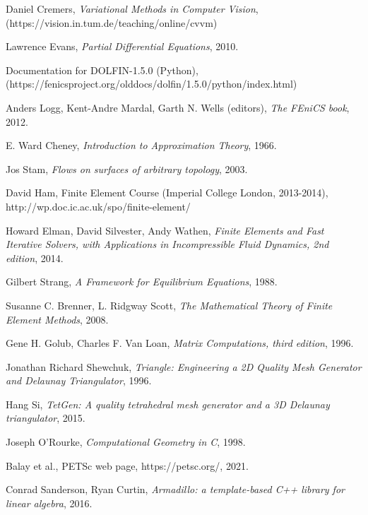 \documentclass[11pt,a4paper]{memoir}
\begin{document}
\begin{thebibliography}{9}
Daniel Cremers,
\textit{Variational Methods in Computer Vision},
\\(https://vision.in.tum.de/teaching/online/cvvm)

Lawrence Evans,
\textit{Partial Differential Equations},
2010.

Documentation for DOLFIN-1.5.0 (Python),\\
(https://fenicsproject.org/olddocs/dolfin/1.5.0/python/index.html)

Anders Logg, Kent-Andre Mardal, Garth N. Wells (editors),
\textit{The FEniCS book},
2012.

E. Ward Cheney,
\textit{Introduction to Approximation Theory},
1966.

Jos Stam,
\textit{Flows on surfaces of arbitrary topology},
2003.

David Ham, Finite Element Course
(Imperial College London, 2013-2014),\\
http://wp.doc.ic.ac.uk/spo/finite-element/

Howard Elman, David Silvester, Andy Wathen,
\textit{Finite Elements and Fast Iterative Solvers, with Applications in Incompressible Fluid Dynamics, 2nd edition},
2014.

Gilbert Strang,
\textit{A Framework for Equilibrium Equations},
1988.

Susanne C. Brenner, L. Ridgway Scott,
\textit{The Mathematical Theory of Finite Element Methods},
2008.

Gene H. Golub, Charles F. Van Loan,
\textit{Matrix Computations, third edition},
1996.

Jonathan Richard Shewchuk,
\textit{Triangle: Engineering a 2D Quality Mesh Generator and Delaunay Triangulator},
1996.

Hang Si,
\textit{TetGen: A quality tetrahedral mesh generator and a 3D Delaunay triangulator},
2015.

Joseph O'Rourke,
\textit{Computational Geometry in C},
1998.

Balay et al.,
PETSc web page, https://petsc.org/,
2021.

Conrad Sanderson, Ryan Curtin,
\textit{Armadillo: a template-based C++ library for linear algebra},
2016.


\end{thebibliography}
\end{document}

